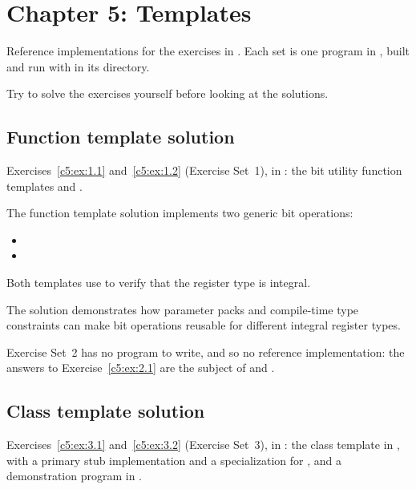 
\section{Chapter 5: Templates}
\label{sol:sec:c5}
Reference implementations for the exercises in . Each set is one program
in , built and run with  in its directory.

\note Try to solve the exercises yourself before looking at the solutions.

\subsection{Function template solution}
\label{sol:set:c5.1}
Exercises~\ref{c5:ex:1.1} and~\ref{c5:ex:1.2} (Exercise Set~1), in
: the bit utility function templates  and
.

The function template solution implements two generic bit operations:
\begin{itemize}
  \item {}
  \item {}
\end{itemize}
Both templates use  to verify that the register type is integral.

The solution demonstrates how parameter packs and compile-time type constraints can make bit
operations reusable for different integral register types.


\noindent Exercise Set~2 has no program to write, and so no reference implementation: the answers
to Exercise~\ref{c5:ex:2.1} are the subject of  and
.

\subsection{Class template solution}
\label{sol:set:c5.3}
Exercises~\ref{c5:ex:3.1} and~\ref{c5:ex:3.2} (Exercise Set~3), in : the class
template  in , with a primary stub
implementation and a specialization for , and a demonstration
program in .

